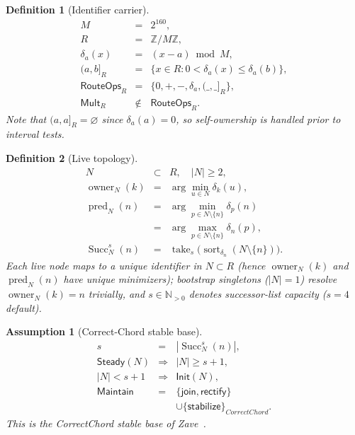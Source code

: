 \documentclass[journal]{IEEEtran}
\newtheorem{definition}{Definition}
\newtheorem{assumption}{Assumption}
\begin{document}
\begin{definition}[Identifier carrier]
\[
\begin{array}{rcl}
M&=&2^{160},\\
R&=&\mathbb{Z}/M\mathbb{Z},\\
\delta_a(x)&=&(x-a)\bmod M,\\
(a,b]_R&=&\{x\in R:0<\delta_a(x)\leq\delta_a(b)\},\\
\mathsf{RouteOps}_R&=&\{0,+,-,\delta_a,(\_,\_]_R\},\\
\mathsf{Mult}_R&\notin&\mathsf{RouteOps}_R.
\end{array}
\]
Note that $(a,a]_R=\varnothing$ since $\delta_a(a)=0$, so self-ownership is handled prior to interval tests.
\end{definition}

\begin{definition}[Live topology]
\[
\begin{array}{rcl}
  N&\subset&R,\quad |N|\ge 2,\\[2pt]
  \operatorname{owner}_N(k)
    &=&\arg\min_{u\in N}\delta_k(u),\\[6pt]
  \operatorname{pred}_N(n)
    &=&\arg\min_{p\in N\setminus\{n\}}\delta_p(n)\\[2pt]
    &=&\arg\max_{p\in N\setminus\{n\}}\delta_n(p),\\[6pt]
  \operatorname{Succ}^s_N(n)
    &=&
    \operatorname{take}_s
    \bigl(\operatorname{sort}_{\delta_n}(N\setminus\{n\})\bigr).
\end{array}
\]
Each live node maps to a unique identifier in $N\subset R$ (hence $\operatorname{owner}_N(k)$ and $\operatorname{pred}_N(n)$ have unique minimizers); bootstrap singletons ($|N|=1$) resolve $\operatorname{owner}_N(k)=n$ trivially, and $s\in\mathbb{N}_{>0}$ denotes successor-list capacity ($s=4$ default).
\end{definition}

\begin{assumption}[Correct-Chord stable base]
\[
\begin{array}{rcl}
s&=&|\operatorname{Succ}^s_N(n)|,\\
\mathsf{Steady}(N)&\Rightarrow&|N|\geq s+1,\\
|N|<s+1&\Rightarrow&\mathsf{Init}(N),\\
\mathsf{Maintain}&=&
  \{\mathsf{join},\mathsf{rectify}\}\\
&&\cup\{\mathsf{stabilize}\}_{CorrectChord}.
\end{array}
\]
This is the CorrectChord stable base of Zave~\cite{Zave2015,ZaveChordCorrect}.
\end{assumption}
\end{document}

